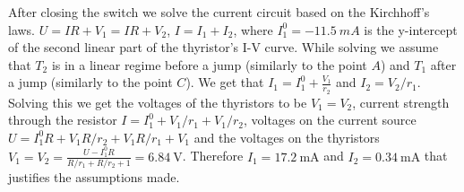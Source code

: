 \begin{figure}[h]
\begin{center}
\end{center}
\end{figure}

After closing the switch we solve the current circuit based on the Kirchhoff’s laws. $U = IR + V_1 = IR + V_2$, $I = I_1 + I_2$, where $I_1^0=\SI{-11.5}{mA}$ is the y-intercept of the second linear part of the thyristor’s I-V curve. While solving we assume that $T_2$ is in a linear regime before a jump (similarly to the point $A$) and $T_1$ after a jump (similarly to the point $C$). We get that $I_1 = I_1^0 + \frac{V_1}{r_2}$ and $I_2 = V_2/r_1$. Solving this we get the voltages of the thyristors to be $V_1 = V_2$, current strength through the resistor $I = I_1^0 + V_1/r_1 + V_1/r_2$, voltages on the current source $U = I_1^0R + V_1R/r_2 + V_1R/r_1 + V_1$ and the voltages on the thyristors $V_1 = V_2 = \frac{U - I_1^0R}{R/r_1 + R/r_2 + 1} = \SI{6.84}{\volt}$. Therefore $I_1 = \SI{17.2}{\milli\ampere}$ and $I_2 = \SI{0.34}{\milli\ampere}$ that justifies the assumptions made.
\probend